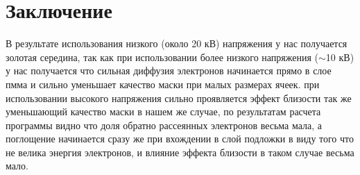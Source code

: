 \chapter*{Заключение}
В результате использования низкого (около 20 кВ) напряжения у нас получается золотая середина,
так как при использовании более низкого напряжения (\(\sim\)10 кВ) у нас получается что сильная диффузия электронов начинается прямо в слое пмма и сильно уменьшает качество маски при малых размерах ячеек.
при использовании высокого напряжения сильно проявляется эффект близости так же уменьшающий качество маски
в нашем же случае, по результатам расчета программы видно что доля обратно рассеянных электронов весьма мала, а поглощение начинается сразу же при вхождении в слой подложки в виду того что не велика энергия электронов, и влияние эффекта близости в таком случае весьма мало.

